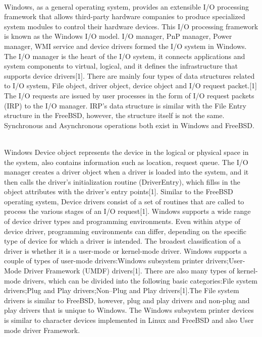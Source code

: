 \documentclass[10pt,draftclsnofoot,peerreview,letterpaper,onecolumn,]{IEEEtran}
\begin{document}
~\\Windows, as a general operating system, provides an extensible I/O processing framework that allows third-party hardware companies to produce specialized system modules to control their hardware devices. This I/O processing framework is known as the Windows I/O model. I/O manager, PnP manager, Power manager, WMI service and device drivers formed the I/O system in Windows. The I/O manager is the heart of the I/O system, it connects applications and system components to virtual, logical, and it defines the infrastructure that supports device drivers[1]. There are mainly four types of data structures related to I/O system, File object, driver object, device object and I/O request packet.[1] The I/O requests are issued by user processes in the form of I/O request packets (IRP) to the I/O manager. IRP’s data structure is similar with the File Entry structure in the FreeBSD, however, the structure itself is not the same. Synchronous and Asynchronous operations both exist in Windows and FreeBSD.

~\\Windows Device object represents the device in the logical or physical space in the system, also contains information such as location, request queue. The I/O manager creates a driver object when a driver is loaded into the system, and it then calls the driver’s initialization routine (DriverEntry), which fillss in the object attributes with the driver’s entry points[1]. Similar to the FreeBSD operating system, Device drivers consist of a set of routines that are called to process the various stages of an I/O request[1]. Windows supports a wide range of device driver types and programming environments. Even within atype of device driver, programming environments can differ, depending on the specific type of device for which a driver is intended. The broadest classification of a driver is whether it is a user-mode or kernel-mode driver. Windows supports a couple of types of user-mode drivers:Windows subsystem printer drivers;User-Mode Driver Framework (UMDF) drivers[1]. There are also many types of kernel-mode drivers, which can be divided into the following basic categories:File system drivers;Plug and Play drivers;Non–Plug and Play drivers[1].The File system drivers is similar to FreeBSD, however, plug and play drivers and non-plug and play drivers that is unique to Windows. The Windows subsystem printer devices is similar to character devices implemented in Linux and FreeBSD and also User mode driver Framework.
\end{document}
